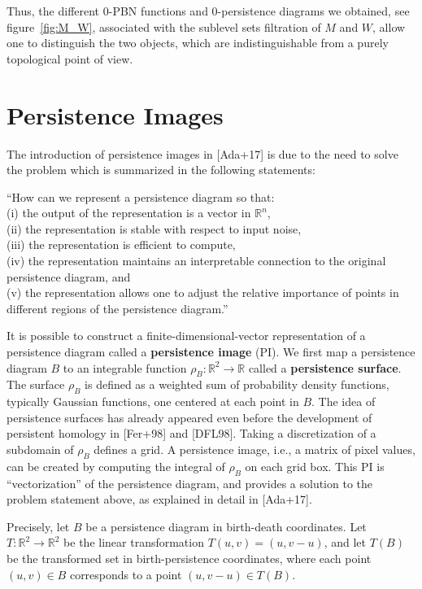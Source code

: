 \documentclass[english, LaM, oneside, noexaminfo]{sapthesis}
\begin{document}
Thus, the different $0$-PBN functions and $0$-persistence diagrams we obtained, see figure~\ref{fig:M_W}, associated with the sublevel sets filtration of $M$ and $W$, allow one to distinguish the two objects, which are indistinguishable from a purely topological point of view.

\section{Persistence Images}
\label{PIs}

The introduction of persistence images in [Ada+17] is due to the need to solve the problem which is summarized in the following statements:

``How can we represent a persistence diagram so that: \\
(i) the output of the representation is a vector in $\mathbb{R}^n$, \\
(ii) the representation is stable with respect to input noise, \\
(iii) the representation is efficient to compute, \\
(iv) the representation maintains an interpretable connection to the original persistence diagram, and \\
(v) the representation allows one to adjust the relative importance of points in different
regions of the persistence diagram.''

It is possible to construct a finite-dimensional-vector representation of a persistence diagram called a {\bf persistence image} (PI). We first map a persistence diagram $B$ to an integrable function $\rho_B: \mathbb{R}^2 \rightarrow \mathbb{R}$ called a {\bf persistence surface}. The surface $\rho_B$ is defined as a weighted sum of probability density functions, typically Gaussian functions, one centered at each point in $B$.  The idea of persistence surfaces has already appeared even  before the development of persistent homology in [Fer+98] and [DFL98]. Taking a discretization of a subdomain of $\rho_B$ defines a grid. A persistence image, i.e., a matrix of pixel values, can be created by computing the integral of $\rho_B$ on each grid box. This PI is ``vectorization'' of the persistence diagram, and provides a solution to the problem statement above, as explained in detail in [Ada+17].

Precisely, let $B$ be a persistence diagram in birth-death coordinates.  Let $T : \mathbb{R}^2 \rightarrow \mathbb{R}^2$ be the linear transformation $T(u, v) = (u, v - u)$, and let $T(B)$ be the transformed set in birth-persistence coordinates, where each point $(u, v) \in B$ corresponds to a point $(u, v - u) \in T(B)$.
\end{document}
